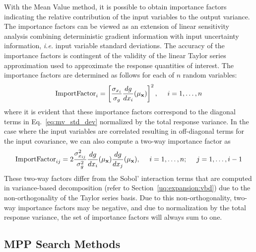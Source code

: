 With the Mean Value method, it is possible to obtain importance
factors indicating the relative contribution of the input variables to
the output variance.  The importance factors can be viewed as an
extension of linear sensitivity analysis combining deterministic
gradient information with input uncertainty information, \emph{i.e.}
input variable standard deviations. The accuracy of the importance
factors is contingent of the validity of the linear Taylor series
approximation used to approximate the response quantities of interest.
The importance factors are determined as follows for each of $n$ random
variables:
\begin{equation}
  {\rm ImportFactor}_i = \left[ \frac{\sigma_{x_i}}{\sigma_g}
  \frac{dg}{dx_i}(\mu_{\bf x}) \right]^2, ~~~~ i = 1, \dots, n
\end{equation}
where it is evident that these importance factors correspond to the
diagonal terms in Eq.~\ref{eq:mv_std_dev} normalized by the total
response variance.  %
In the case where the input variables are correlated
resulting in off-diagonal terms for the input covariance, we can also
compute a two-way importance factor as
\begin{equation}
  {\rm ImportFactor}_{ij} = 2 \frac{\sigma^2_{x_{ij}}}{\sigma^2_g} 
  \frac{dg}{dx_i}(\mu_{\bf x}) \frac{dg}{dx_j}(\mu_{\bf x}),
  ~~~~ i = 1, \dots, n; ~~~~ j = 1, \dots, i-1
\end{equation}
These two-way factors differ from the Sobol' interaction terms that
are computed in variance-based decomposition (refer to
Section~\ref{uq:expansion:vbd}) due to the non-orthogonality of the
Taylor series basis.  Due to this non-orthogonality, two-way
importance factors may be negative, and due to normalization by the
total response variance, the set of importance factors will always sum
to one.


\subsection{MPP Search Methods}\label{uq:reliability:local:mpp}

